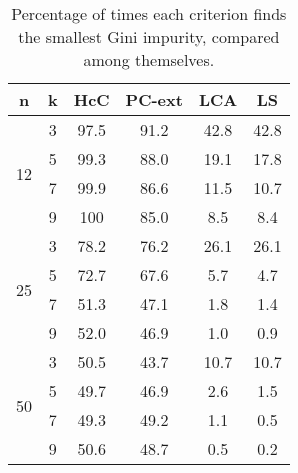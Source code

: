 \begin{table}
\centering
\begin{tabular}{c|c|c|c|c|c} 
        n            &    k        &   HcC        &   PC-ext     &   LCA   &   LS   \\
\hline
\multirow{4}{*}{12}  &    3        &  97.5   &   91.2       &   42.8  &  42.8  \\
                     &    5        &  99.3   &   88.0       &   19.1  &  17.8  \\
                     &    7        &  99.9   &   86.6       &   11.5  &  10.7  \\
                     &    9        &  100    &   85.0       &    8.5  &   8.4  \\
\hline
\multirow{4}{*}{25}  &    3        &  78.2  &   76.2       &   26.1  &  26.1  \\
                     &    5        &  72.7  &   67.6       &    5.7  &   4.7  \\
                     &    7        &  51.3  &   47.1       &    1.8  &   1.4  \\
                     &    9        &  52.0  &   46.9       &    1.0  &   0.9  \\
\hline
\multirow{4}{*}{50}  &    3        &  50.5  &   43.7       &   10.7  &  10.7  \\
                     &    5        &  49.7  &   46.9       &    2.6  &   1.5  \\
                     &    7        &  49.3  &   49.2       &    1.1  &   0.5  \\
                     &    9        &  50.6  &   48.7       &    0.5  &   0.2
\end{tabular}
\caption{Percentage of times each criterion finds the smallest Gini impurity, compared among themselves.}
\label{tab:Splits-Gini}
\end{table}


